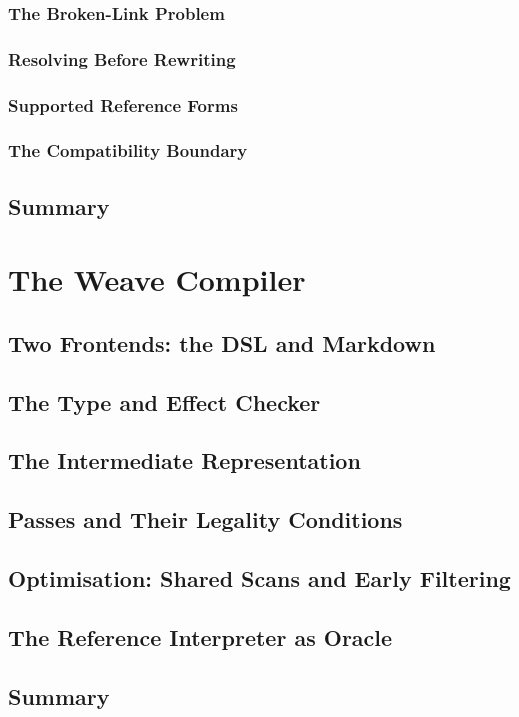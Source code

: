 \documentclass[nohyper,nobib]{tufte-book}
\begin{document}
\subsection{The Broken-Link Problem}
\subsection{Resolving Before Rewriting}
\subsection{Supported Reference Forms}
\subsection{The Compatibility Boundary}
\section{Summary}

\chapter{The Weave Compiler}
\section{Two Frontends: the DSL and Markdown}
\section{The Type and Effect Checker}
\section{The Intermediate Representation}
\section{Passes and Their Legality Conditions}
\section{Optimisation: Shared Scans and Early Filtering}
\section{The Reference Interpreter as Oracle}
\section{Summary}
\end{document}
